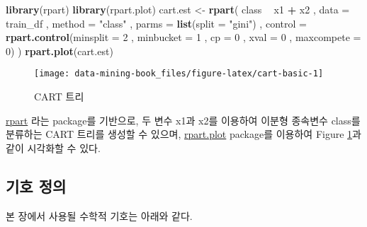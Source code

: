 \documentclass[]{book}
\newenvironment{Shaded}{\begin{snugshade}}{\end{snugshade}}
\newcommand{\DataTypeTok}[1]{\textcolor[rgb]{0.13,0.29,0.53}{#1}}
\newcommand{\DecValTok}[1]{\textcolor[rgb]{0.00,0.00,0.81}{#1}}
\newcommand{\KeywordTok}[1]{\textcolor[rgb]{0.13,0.29,0.53}{\textbf{#1}}}
\newcommand{\NormalTok}[1]{#1}
\newcommand{\OperatorTok}[1]{\textcolor[rgb]{0.81,0.36,0.00}{\textbf{#1}}}
\newcommand{\StringTok}[1]{\textcolor[rgb]{0.31,0.60,0.02}{#1}}
\begin{document}
\begin{Shaded}
\begin{Highlighting}[]
\KeywordTok{library}\NormalTok{(rpart)}
\KeywordTok{library}\NormalTok{(rpart.plot)}
\NormalTok{cart.est <-}\StringTok{ }\KeywordTok{rpart}\NormalTok{(}
\NormalTok{  class }\OperatorTok{~}\StringTok{ }\NormalTok{x1 }\OperatorTok{+}\StringTok{ }\NormalTok{x2}
\NormalTok{  , }\DataTypeTok{data =}\NormalTok{ train_df}
\NormalTok{  , }\DataTypeTok{method =} \StringTok{"class"}
\NormalTok{  , }\DataTypeTok{parms =} \KeywordTok{list}\NormalTok{(}\DataTypeTok{split =} \StringTok{"gini"}\NormalTok{)}
\NormalTok{  , }\DataTypeTok{control =} \KeywordTok{rpart.control}\NormalTok{(}\DataTypeTok{minsplit =} \DecValTok{2}
\NormalTok{                            , }\DataTypeTok{minbucket =} \DecValTok{1}
\NormalTok{                            , }\DataTypeTok{cp =} \DecValTok{0}
\NormalTok{                            , }\DataTypeTok{xval =} \DecValTok{0}
\NormalTok{                            , }\DataTypeTok{maxcompete =} \DecValTok{0}\NormalTok{)}
\NormalTok{  )}
\KeywordTok{rpart.plot}\NormalTok{(cart.est)}
\end{Highlighting}
\end{Shaded}

\begin{figure}

{\centering \texttt{[image: data-mining-book\_files/figure-latex/cart-basic-1]} 

}

\caption{CART 트리}\label{fig:cart-basic}
\end{figure}

\href{https://cran.r-project.org/web/packages/rpart/}{rpart} 라는 package를 기반으로, 두 변수 x1과 x2를 이용하여 이분형 종속변수 class를 분류하는 CART 트리를 생성할 수 있으며, \href{https://cran.r-project.org/web/packages/rpart.plot/}{rpart.plot} package를 이용하여 Figure \ref{fig:cart-basic}과 같이 시각화할 수 있다.

\hypertarget{cart-notation}{%
\subsection{기호 정의}\label{cart-notation}}

본 장에서 사용될 수학적 기호는 아래와 같다.
\end{document}
